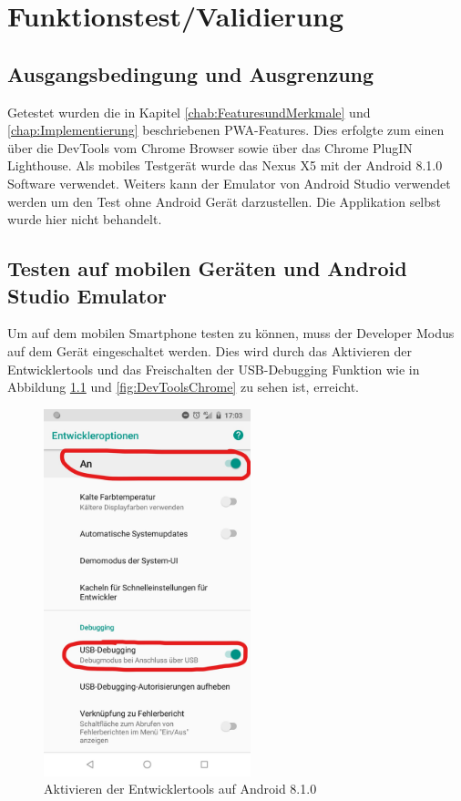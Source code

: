 \chapter{Funktionstest/Validierung}\label{chap:Funktionstest}
\thispagestyle{standard}
\pagestyle{standard}

\section{Ausgangsbedingung und Ausgrenzung}
Getestet wurden die in Kapitel \ref{chab:FeaturesundMerkmale} und \ref{chap:Implementierung} beschriebenen PWA-Features. Dies erfolgte zum einen über die DevTools vom Chrome Browser sowie über das Chrome PlugIN Lighthouse. 
Als mobiles Testgerät wurde das Nexus X5 mit der Android 8.1.0 Software verwendet.  
Weiters kann der Emulator von Android Studio verwendet werden um den Test ohne Android Gerät darzustellen. Die Applikation selbst wurde hier nicht behandelt.
 
\section{Testen auf mobilen Geräten und Android Studio Emulator}
Um auf dem mobilen Smartphone testen zu können, muss der Developer Modus auf dem Gerät eingeschaltet werden. Dies wird durch das Aktivieren der Entwicklertools und das Freischalten der USB-Debugging Funktion wie in Abbildung \ref{fig:DevToolsAndorid} und \ref{fig:DevToolsChrome} zu sehen ist, erreicht. 

\begin{figure}[h]
	\centering
	\includegraphics[width=6cm]{BilderAllgemein/DevToolsAndroid}\medskip
	\caption{Aktivieren der Entwicklertools auf Android 8.1.0}
	\label{fig:DevToolsAndorid}
\end{figure}

